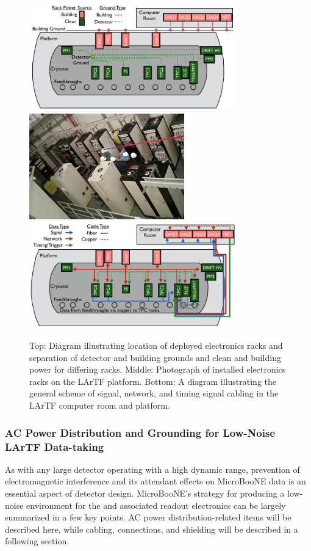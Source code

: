 \begin{figure}[htb!pb]
\centering
\includegraphics[width=0.8\textwidth]{./figures/ACDist.png}
\includegraphics[width=0.6\textwidth]{./figures/ActualRacks.png}
\includegraphics[width=0.8\textwidth]{./figures/DataDist.png}
\caption[]{Top: Diagram illustrating location of deployed electronics racks and separation of detector and building grounds and clean and building power for differing racks.  Middle: Photograph of installed electronics racks on the LArTF platform.  Bottom: A diagram illustrating the general scheme of signal, network, and timing signal cabling in the LArTF computer room and platform.}
\label{fig:ElecInfDiagrams}
\end{figure}

\subsubsection{AC Power Distribution and Grounding for Low-Noise LArTF Data-taking}
As with any large detector operating with a high dynamic range, prevention of electromagnetic interference and its attendant effects on MicroBooNE data is an essential aspect of detector design.  MicroBooNE's strategy for producing a low-noise environment for the \lartpc and associated readout electronics can be largely summarized in a few key points.  AC power distribution-related items will be described here, while cabling, connections, and shielding will be described in a following section.


